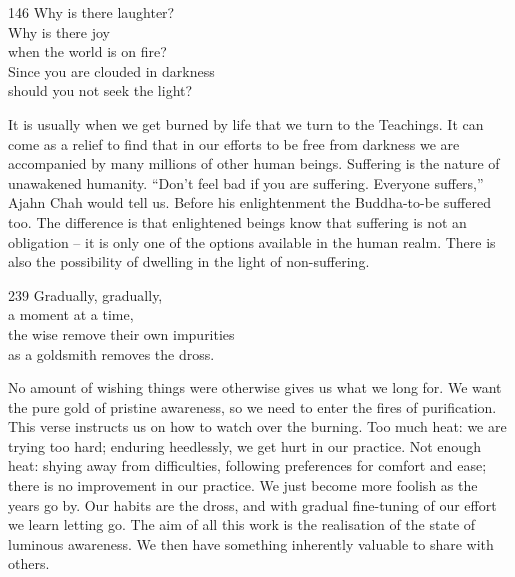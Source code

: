 
\begin{dhpVerse}{146}
\label{dhp-146}
Why is there laughter?\\
Why is there joy\\
when the world is on fire?\\
Since you are clouded in darkness\\
should you not seek the light?
\end{dhpVerse}

\begin{dhpRefl}

It is usually when we get burned by life that we turn to the
Teachings. It can come as a relief to find that in our efforts to be
free from darkness we are accompanied by many millions of other human
beings. Suffering is the nature of unawakened humanity. ``Don't feel
bad if you are suffering. Everyone suffers,'' Ajahn Chah would tell
us. Before his enlightenment the Buddha-to-be suffered too. The
difference is that enlightened beings know that suffering is not an
obligation -- it is only one of the options available in the human
realm. There is also the possibility of dwelling in the light of
non-suffering.

\end{dhpRefl}


\begin{dhpVerse}{239}
\label{dhp-239}
Gradually, gradually,\\
a moment at a time,\\
the wise remove their own impurities\\
as a goldsmith removes the dross.
\end{dhpVerse}

\begin{dhpRefl}

No amount of wishing things were otherwise gives us what we long for.
We want the pure gold of pristine awareness, so we need to enter the
fires of purification. This verse instructs us on how to watch over
the burning. Too much heat: we are trying too hard; enduring
heedlessly, we get hurt in our practice. Not enough heat: shying
away from difficulties, following preferences for comfort and ease;
there is no improvement in our practice. We just become more foolish
as the years go by. Our habits are the dross, and with gradual
fine-tuning of our effort we learn letting go. The aim of all this
work is the realisation of the state of luminous awareness. We then
have something inherently valuable to share with others.

\end{dhpRefl}

